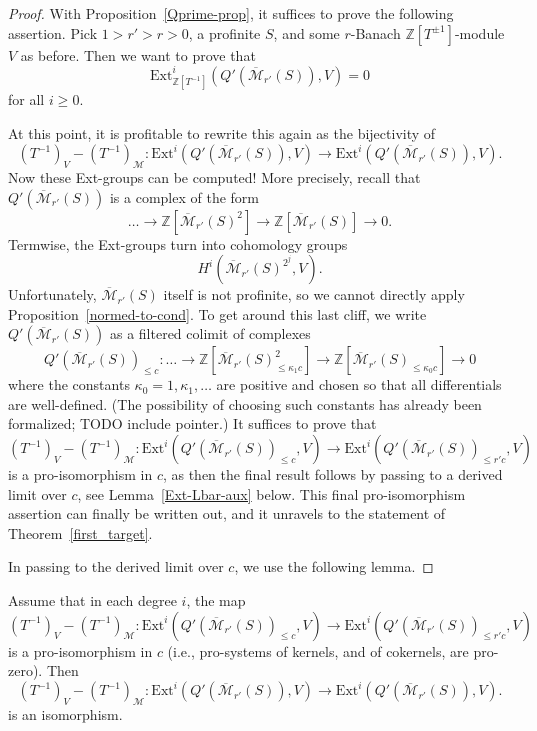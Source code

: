 \begin{proof}
  With Proposition~\ref{Qprime-prop}, it suffices to prove the following assertion.
  Pick $1>r'>r>0$, a profinite $S$, and some $r$-Banach $\mathbb Z[T^{\pm 1}]$-module $V$ as before.
  Then we want to prove that
  \[ \mathrm{Ext}^i_{\mathbb Z[T^{-1}]}(Q'(\overline{\mathcal M}_{r'}(S)),V)=0 \]
  for all $i\geq 0$.

  At this point, it is profitable to rewrite this again as the bijectivity of
  \[ (T^{-1})_V - (T^{-1})_{\mathcal M}: \mathrm{Ext}^i(Q'(\overline{\mathcal M}_{r'}(S)),V)\to \mathrm{Ext}^i(Q'(\overline{\mathcal M}_{r'}(S)),V). \]
  Now these Ext-groups can be computed! More precisely, recall that $Q'(\overline{\mathcal M}_{r'}(S))$ is a complex of the form
  \[ \ldots\to \mathbb Z[\overline{\mathcal M}_{r'}(S)^2]\to \mathbb Z[\overline{\mathcal M}_{r'}(S)]\to 0.  \]
  Termwise, the Ext-groups turn into cohomology groups
  \[ H^i(\overline{\mathcal M}_{r'}(S)^{2^j},V).  \]
  Unfortunately, $\overline{\mathcal M}_{r'}(S)$ itself is not profinite, so we cannot directly apply Proposition~\ref{normed-to-cond}.
  To get around this last cliff, we write $Q'(\overline{\mathcal M}_{r'}(S))$ as a filtered colimit of complexes
  \[ Q'(\overline{\mathcal M}_{r'}(S))_{\leq c}: \ldots \to \mathbb Z[\overline{\mathcal M}_{r'}(S)^2_{\leq \kappa_1 c}]\to \mathbb Z[\overline{\mathcal M}_{r'}(S)_{\leq \kappa_0 c}]\to 0 \]
  where the constants $\kappa_0=1,\kappa_1,\ldots$ are positive and chosen so that all differentials are well-defined.
  (The possibility of choosing such constants has already been formalized; TODO include pointer.)
  It suffices to prove that
  \[ (T^{-1})_V - (T^{-1})_{\mathcal M}: \mathrm{Ext}^i(Q'(\overline{\mathcal M}_{r'}(S))_{\leq c},V)\to \mathrm{Ext}^i(Q'(\overline{\mathcal M}_{r'}(S))_{\leq r' c},V) \]
  is a pro-isomorphism in $c$, as then the final result follows by passing to a derived limit over $c$, see Lemma~\ref{Ext-Lbar-aux} below.
  This final pro-isomorphism assertion can finally be written out, and it unravels to the statement of Theorem~\ref{first_target}.

  In passing to the derived limit over $c$, we use the following lemma.
\end{proof}

\begin{lemma}
  \label{Ext-Lbar-aux}
  Assume that in each degree $i$, the map
  \[ (T^{-1})_V - (T^{-1})_{\mathcal M}: \mathrm{Ext}^i(Q'(\overline{\mathcal M}_{r'}(S))_{\leq c},V)\to \mathrm{Ext}^i(Q'(\overline{\mathcal M}_{r'}(S))_{\leq r' c},V) \]
  is a pro-isomorphism in $c$ (i.e., pro-systems of kernels, and of cokernels, are pro-zero). Then
  \[ (T^{-1})_V - (T^{-1})_{\mathcal M}: \mathrm{Ext}^i(Q'(\overline{\mathcal M}_{r'}(S)),V)\to \mathrm{Ext}^i(Q'(\overline{\mathcal M}_{r'}(S)),V).  \]
  is an isomorphism.
\end{lemma}

